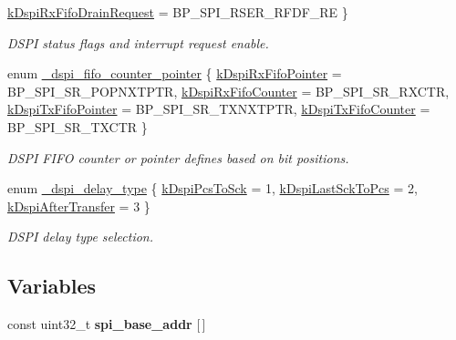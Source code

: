 \begin{DoxyCompactItemize}
\hyperlink{group__dspi__hal_gga4ceea9e434ef062f9d1a9f34520143a3a573f7989c51c8a6fe6a48dd6388b32d1}{k\+Dspi\+Rx\+Fifo\+Drain\+Request} = B\+P\+\_\+\+S\+P\+I\+\_\+\+R\+S\+E\+R\+\_\+\+R\+F\+D\+F\+\_\+\+RE
 \}\begin{DoxyCompactList}\small\item\em D\+S\+PI status flags and interrupt request enable. \end{DoxyCompactList}
\item 
enum \hyperlink{group__dspi__hal_ga7840b2a1d0cefe7f4168ab8384ee0e99}{\+\_\+dspi\+\_\+fifo\+\_\+counter\+\_\+pointer} \{ \hyperlink{group__dspi__hal_gga7840b2a1d0cefe7f4168ab8384ee0e99ac6931fb9e3b476e6fd89401b83ac3067}{k\+Dspi\+Rx\+Fifo\+Pointer} = B\+P\+\_\+\+S\+P\+I\+\_\+\+S\+R\+\_\+\+P\+O\+P\+N\+X\+T\+P\+TR, 
\hyperlink{group__dspi__hal_gga7840b2a1d0cefe7f4168ab8384ee0e99acf7633495ed23f4216d761ae1be426a3}{k\+Dspi\+Rx\+Fifo\+Counter} = B\+P\+\_\+\+S\+P\+I\+\_\+\+S\+R\+\_\+\+R\+X\+C\+TR, 
\hyperlink{group__dspi__hal_gga7840b2a1d0cefe7f4168ab8384ee0e99ae0c9617e48e3fb684e9358ada3925af3}{k\+Dspi\+Tx\+Fifo\+Pointer} = B\+P\+\_\+\+S\+P\+I\+\_\+\+S\+R\+\_\+\+T\+X\+N\+X\+T\+P\+TR, 
\hyperlink{group__dspi__hal_gga7840b2a1d0cefe7f4168ab8384ee0e99a4f5aa8b944ed48d343f58caf405d4b2c}{k\+Dspi\+Tx\+Fifo\+Counter} = B\+P\+\_\+\+S\+P\+I\+\_\+\+S\+R\+\_\+\+T\+X\+C\+TR
 \}\begin{DoxyCompactList}\small\item\em D\+S\+PI F\+I\+FO counter or pointer defines based on bit positions. \end{DoxyCompactList}
\item 
enum \hyperlink{group__dspi__hal_ga86dbb9c380b74c6654a44a73e90573f9}{\+\_\+dspi\+\_\+delay\+\_\+type} \{ \hyperlink{group__dspi__hal_gga86dbb9c380b74c6654a44a73e90573f9a1b1297e9388df6c83b58ca3bbb3cb267}{k\+Dspi\+Pcs\+To\+Sck} = 1, 
\hyperlink{group__dspi__hal_gga86dbb9c380b74c6654a44a73e90573f9ae7abf34372d1fd3044103519f52865c8}{k\+Dspi\+Last\+Sck\+To\+Pcs} = 2, 
\hyperlink{group__dspi__hal_gga86dbb9c380b74c6654a44a73e90573f9a0993c646e3ceed8b6a36ae347592813f}{k\+Dspi\+After\+Transfer} = 3
 \}\begin{DoxyCompactList}\small\item\em D\+S\+PI delay type selection. \end{DoxyCompactList}
\end{DoxyCompactItemize}
\subsection*{Variables}
\begin{DoxyCompactItemize}
\item 
const uint32\+\_\+t {\bfseries spi\+\_\+base\+\_\+addr} \mbox{[}$\,$\mbox{]}\hypertarget{group__dspi__hal_ga6bd24631b7048622d7cfb8583755a506}{}\label{group__dspi__hal_ga6bd24631b7048622d7cfb8583755a506}

\end{DoxyCompactItemize}
